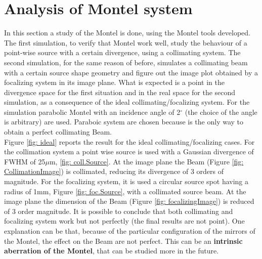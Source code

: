 \section{Analysis of Montel system}
In this section a study of the Montel is done, using the Montel tools developed. The first simulation, to verify that Montel work well, study the behaviour of a point-wise source with a certain divergence, using a collimating system. The second simulation, for the same reason of before, simulates a collimating beam with a certain source shape geometry and figure out the image plot obtained by a focalizing system in its image plane. What is expected is a point in the divergence space for the first situation and in the real space for the second simulation, as a consequence of the ideal collimating/focalizing system. For the simulation parabolic Montel with an incidence angle of 2$^{\circ} $ (the choice of the angle is arbitrary) are used. Paraboic system are chosen because is the only way to obtain a perfect collimating Beam.
\\
Figure \ref{fig: ideal} reports the result for the ideal collimating/focalizing cases.
For the collimation system a point wise source  is used with a Gaussian divergence of FWHM of 25$\mu $m, \ref{fig: coll.Source}. At the image plane the Beam (Figure \ref{fig: CollimationImage}) is collimated, reducing its divergence of 3 orders of magnitude. For the focalizing system, it is used a circular source spot having a radius of 1mm, Figure \ref{fig: foc.Source}, with a collimated source beam. At the image plane the dimension of the Beam (Figure \ref{fig: focalizingImage}) is reduced of 3 order magnitude. It is possible to conclude that both collimating and focalizing system work but not perfectly (the final results are not point). One explanation can be that, because of the particular configuration of the mirrors of the Montel, the effect on the Beam are not perfect. This can be an \textbf{intrinsic aberration of the Montel}, that can be studied more in the future.
\\
